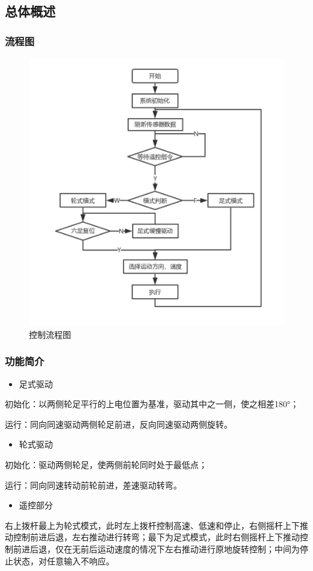 \documentclass[12pt]{article}
\begin{document}
\begin{CJK}{UTF8}{song}
\subsection{总体概述}
\subsubsection{流程图}
 \begin{figure}[H]
\centering
\includegraphics[width=.8\textwidth]{chap5//fig1.jpg}
\caption{控制流程图}
\end{figure}
\subsubsection{功能简介}
\begin{itemize}
\item 足式驱动
\end{itemize}\par
初始化：以两侧轮足平行的上电位置为基准，驱动其中之一侧，使之相差180°；\par
运行：同向同速驱动两侧轮足前进，反向同速驱动两侧旋转。
\begin{itemize}
\item 轮式驱动
\end{itemize}\par
初始化：驱动两侧轮足，使两侧前轮同时处于最低点；\par
运行：同向同速转动前轮前进，差速驱动转弯。

\begin{itemize}
\item 遥控部分
\end{itemize}\par
右上拨杆最上为轮式模式，此时左上拨杆控制高速、低速和停止，右侧摇杆上下推动控制前进后退，左右推动进行转弯；最下为足式模式，此时右侧摇杆上下推动控制前进后退，仅在无前后运动速度的情况下左右推动进行原地旋转控制；中间为停止状态，对任意输入不响应。

\end{CJK}
\end{document}
